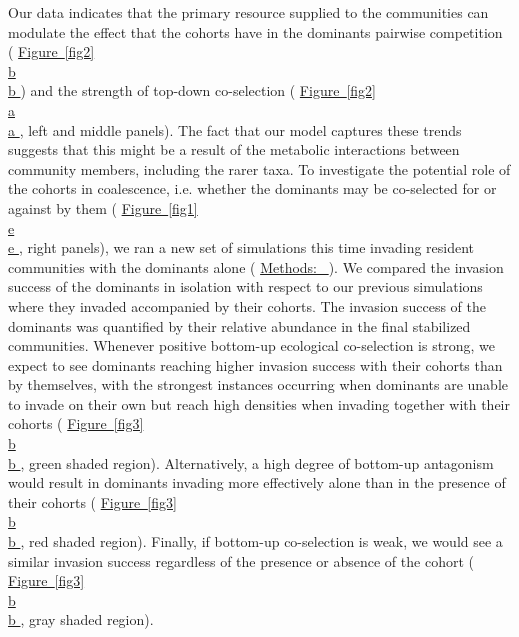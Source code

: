 \documentclass[a4paper,10pt]{article}
\newcommand{\figref}[2][]{%
  \hyperref[{#2}]{%
    Figure~\ref*{#2}%
    \ifx\\#1\\%
    \else
      #1%
    \fi
  }%
}
\newcommand{\methodsref}[1]{%
  \hyperref[{methods:#1}]{%
   Methods:~\nameref*{methods:#1}%
  }%
}
\begin{document}
Our data indicates that the primary resource supplied to the communities can modulate
the effect that the cohorts have in the dominants pairwise competition
(\figref[b]{fig2})
and the strength of top-down co-selection
(\figref[a]{fig2}, left and middle panels).
The fact that
our model captures these trends
suggests that this might be a result of the metabolic interactions
between community members, including the rarer taxa.
To investigate the potential role of the cohorts in coalescence,
 i.e. whether the dominants may be co-selected for or against by them
(\figref[e]{fig1}, right panels),
we ran a new set of simulations
this time invading resident communities with the dominants alone
(\methodsref{sim}).
We compared the invasion success of the dominants in isolation with respect to our previous
simulations where they invaded accompanied by their cohorts.
The invasion success of the dominants was quantified by their relative abundance
in the final stabilized communities.
Whenever positive bottom-up ecological co-selection is strong, we expect to see dominants
reaching higher invasion success with their cohorts than by themselves,
with the strongest instances occurring when dominants are unable to invade on their own
but reach high densities when invading together with their cohorts
(\figref[b]{fig3}, green shaded region).
Alternatively, a high degree of bottom-up antagonism would result in dominants
invading more effectively alone than in the presence of their cohorts
(\figref[b]{fig3}, red shaded region).
Finally, if bottom-up co-selection is weak, we would see a similar invasion success
regardless of the presence or absence of the cohort
(\figref[b]{fig3}, gray shaded region).
\end{document}
